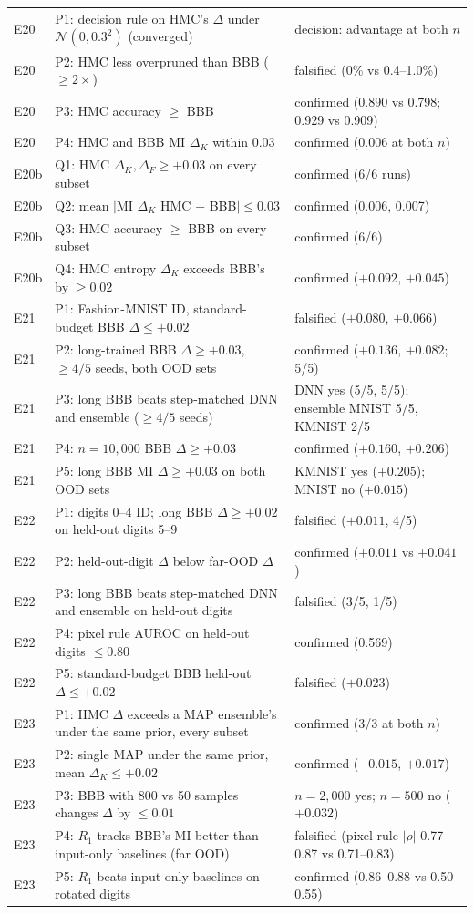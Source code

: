 \documentclass[10pt]{article}
\begin{document}
{\begin{longtable}{p{0.9cm}p{8.6cm}p{4.6cm}}
E20 & P1: decision rule on HMC's $\Delta$ under $\mathcal N(0,0.3^2)$ (converged) & decision: advantage at both $n$ \\
E20 & P2: HMC less overpruned than BBB ($\ge2\times$) & falsified (0\% vs 0.4--1.0\%) \\
E20 & P3: HMC accuracy $\ge$ BBB & confirmed (0.890 vs 0.798; 0.929 vs 0.909) \\
E20 & P4: HMC and BBB MI $\Delta_K$ within 0.03 & confirmed (0.006 at both $n$) \\
E20b & Q1: HMC $\Delta_K,\Delta_F\ge+0.03$ on every subset & confirmed (6/6 runs) \\
E20b & Q2: mean $|$MI $\Delta_K$ HMC $-$ BBB$|\le0.03$ & confirmed (0.006, 0.007) \\
E20b & Q3: HMC accuracy $\ge$ BBB on every subset & confirmed (6/6) \\
E20b & Q4: HMC entropy $\Delta_K$ exceeds BBB's by $\ge0.02$ & confirmed ($+0.092$, $+0.045$) \\
E21 & P1: Fashion-MNIST ID, standard-budget BBB $\Delta\le+0.02$ & falsified ($+0.080$, $+0.066$) \\
E21 & P2: long-trained BBB $\Delta\ge+0.03$, $\ge4/5$ seeds, both OOD sets & confirmed ($+0.136$, $+0.082$; 5/5) \\
E21 & P3: long BBB beats step-matched DNN and ensemble ($\ge4/5$ seeds) & DNN yes (5/5, 5/5); ensemble MNIST 5/5, KMNIST 2/5 \\
E21 & P4: $n=10{,}000$ BBB $\Delta\ge+0.03$ & confirmed ($+0.160$, $+0.206$) \\
E21 & P5: long BBB MI $\Delta\ge+0.03$ on both OOD sets & KMNIST yes ($+0.205$); MNIST no ($+0.015$) \\
E22 & P1: digits 0--4 ID; long BBB $\Delta\ge+0.02$ on held-out digits 5--9 & falsified ($+0.011$, 4/5) \\
E22 & P2: held-out-digit $\Delta$ below far-OOD $\Delta$ & confirmed ($+0.011$ vs $+0.041$) \\
E22 & P3: long BBB beats step-matched DNN and ensemble on held-out digits & falsified (3/5, 1/5) \\
E22 & P4: pixel rule AUROC on held-out digits $\le0.80$ & confirmed (0.569) \\
E22 & P5: standard-budget BBB held-out $\Delta\le+0.02$ & falsified ($+0.023$) \\
E23 & P1: HMC $\Delta$ exceeds a MAP ensemble's under the same prior, every subset & confirmed (3/3 at both $n$) \\
E23 & P2: single MAP under the same prior, mean $\Delta_K\le+0.02$ & confirmed ($-0.015$, $+0.017$) \\
E23 & P3: BBB with 800 vs 50 samples changes $\Delta$ by $\le0.01$ & $n=2{,}000$ yes; $n=500$ no ($+0.032$) \\
E23 & P4: $R_1$ tracks BBB's MI better than input-only baselines (far OOD) & falsified (pixel rule $|\rho|$ 0.77--0.87 vs 0.71--0.83) \\
E23 & P5: $R_1$ beats input-only baselines on rotated digits & confirmed (0.86--0.88 vs 0.50--0.55) \\
\end{longtable}
}
\end{document}
